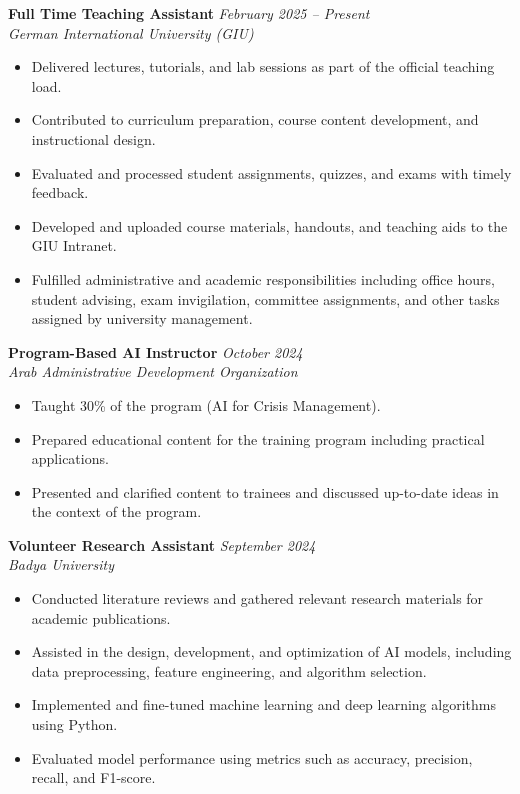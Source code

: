 \documentclass[a4paper,11pt]{article}
\newcommand{\cventry}[4]{%
  \textbf{#1} \hfill \textit{#3} \\
  \textit{#2} \hfill \textit{#4}
  \vspace{2pt}
}
\begin{document}
\vspace{6pt}

\cventry{Full Time Teaching Assistant}{German International University (GIU)}{February 2025 -- Present}{}
\begin{itemize}[leftmargin=1.5em, topsep=2pt, itemsep=1pt]
  \item Delivered lectures, tutorials, and lab sessions as part of the official teaching load.
  \item Contributed to curriculum preparation, course content development, and instructional design.
  \item Evaluated and processed student assignments, quizzes, and exams with timely feedback.
  \item Developed and uploaded course materials, handouts, and teaching aids to the GIU Intranet.
  \item Fulfilled administrative and academic responsibilities including office hours, student advising, exam invigilation, committee assignments, and other tasks assigned by university management.
\end{itemize}

\vspace{6pt}

\cventry{Program-Based AI Instructor}{Arab Administrative Development Organization}{October 2024}{}
\begin{itemize}[leftmargin=1.5em, topsep=2pt, itemsep=1pt]
  \item Taught 30\% of the program (AI for Crisis Management).
  \item Prepared educational content for the training program including practical applications.
  \item Presented and clarified content to trainees and discussed up-to-date ideas in the context of the program.
\end{itemize}

\vspace{6pt}

\cventry{Volunteer Research Assistant}{Badya University}{September 2024}{}
\begin{itemize}[leftmargin=1.5em, topsep=2pt, itemsep=1pt]
  \item Conducted literature reviews and gathered relevant research materials for academic publications.
  \item Assisted in the design, development, and optimization of AI models, including data preprocessing, feature engineering, and algorithm selection.
  \item Implemented and fine-tuned machine learning and deep learning algorithms using Python.
  \item Evaluated model performance using metrics such as accuracy, precision, recall, and F1-score.
\end{itemize}
\end{document}
